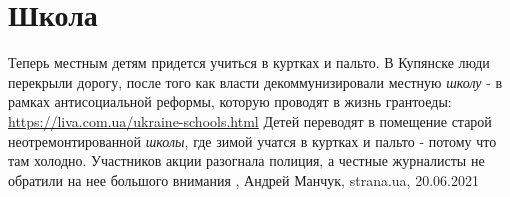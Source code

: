  
 
 
 
 
\chapter{Школа}
\label{sec:slova.shkola}

Теперь местным детям придется учиться в куртках и пальто. В Купянске люди
перекрыли дорогу, после того как власти декоммунизировали местную \emph{школу}
- в рамках антисоциальной реформы, которую проводят в жизнь грантоеды:
\url{https://liva.com.ua/ukraine-schools.html} Детей переводят в помещение
старой неотремонтированной \emph{школы}, где зимой учатся в куртках и пальто -
потому что там холодно. Участников акции разогнала полиция, а честные
журналисты не обратили на нее большого внимания
, 
Андрей Манчук, strana.ua, 20.06.2021

